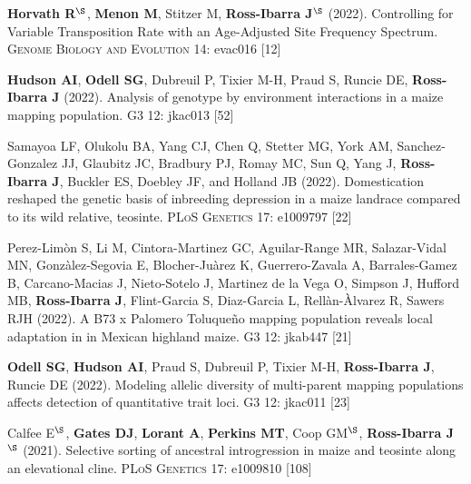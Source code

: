 \documentclass[letterpaper,10pt]{article}
\begin{document}
\begin{etaremune}
\item \textbf{Horvath R}$^\S$, \textbf{Menon M}, Stitzer M, \textbf{Ross-Ibarra J}$^\S$ (2022). Controlling for Variable Transposition Rate with an Age-Adjusted Site Frequency Spectrum. \textsc{Genome Biology and Evolution}  14: evac016 %
{} [12]\\

\item \textbf{Hudson AI}, \textbf{Odell SG}, Dubreuil P, Tixier M-H, Praud S, Runcie DE, \textbf{Ross-Ibarra J} (2022).  Analysis of genotype by environment interactions in a maize mapping population. \textsc{G3} 12: jkac013 %
{} [52]\\

\item  Samayoa LF, Olukolu  BA, Yang CJ, Chen Q, Stetter MG, York AM, Sanchez-Gonzalez JJ,  Glaubitz JC, Bradbury PJ,  Romay MC, Sun Q, Yang J, \textbf{Ross-Ibarra J}, Buckler ES, Doebley JF, and Holland JB (2022).   Domestication reshaped the genetic basis of inbreeding depression in a maize landrace compared to its wild relative, teosinte. \textsc{PLoS Genetics} 17: e1009797 %
{} [22]\\

\item Perez-Lim\`{o}n S, Li M, Cintora-Martinez GC, Aguilar-Range MR, Salazar-Vidal MN, Gonz\`{a}lez-Segovia E, Blocher-Ju\`{a}rez K, Guerrero-Zavala A, Barrales-Gamez B, Carcano-Macias J,  Nieto-Sotelo J, Martinez de la Vega O, Simpson J, Hufford MB, \textbf{Ross-Ibarra J}, Flint-Garcia S, Diaz-Garcia L, Rell\`{a}n-\`{A}lvarez R, Sawers RJH (2022). A B73 x Palomero Toluque\~{n}o mapping population reveals local adaptation in in Mexican highland maize. \textsc{G3} 12: jkab447 %
{} [21]\\

\item \textbf{Odell SG}, \textbf{Hudson AI}, Praud S, Dubreuil P, Tixier M-H, \textbf{Ross-Ibarra J}, Runcie DE (2022). Modeling allelic diversity of multi-parent mapping populations affects detection of quantitative trait loci. \textsc{G3} 12: jkac011 %
{} [23]\\

\item Calfee E$^\S$, \textbf{Gates DJ}, \textbf{Lorant A}, \textbf{Perkins MT}, Coop GM$^\S$, \textbf{Ross-Ibarra J}$^\S$ (2021). Selective sorting of ancestral introgression in maize and teosinte along an elevational cline. \textsc{PLoS Genetics} 17: e1009810
{} [108]\\


\end{etaremune}
\end{document}
